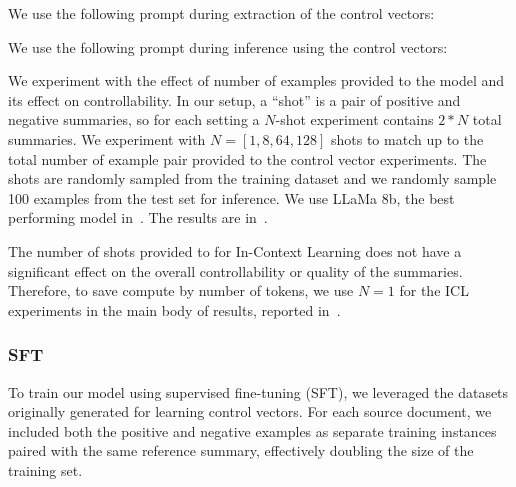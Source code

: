 
We use the following prompt during extraction of the control vectors:


We use the following prompt during inference using the control vectors:


We experiment with the effect of number of examples provided to the model and its effect on controllability. In our setup, a ``shot'' is a pair of positive and negative summaries, so for each setting a $N$-shot experiment contains $2*N$ total summaries. We experiment with $N=[1,8,64,128]$ shots to match up to the total number of example pair provided to the control vector experiments. The shots are randomly sampled from the training dataset and we randomly sample 100 examples from the test set for inference. We use LLaMa 8b, the best performing model in~. The results are in~.


The number of shots provided to for In-Context Learning does not have a significant effect on the overall controllability or quality of the summaries. Therefore, to save compute by number of tokens, we use $N=1$ for the ICL experiments in the main body of results, reported in~.


\subsubsection{SFT}
To train our model using supervised fine-tuning (SFT), we leveraged the datasets originally generated for learning control vectors. For each source document, we included both the positive and negative examples as separate training instances paired with the same reference summary, effectively doubling the size of the training set.

